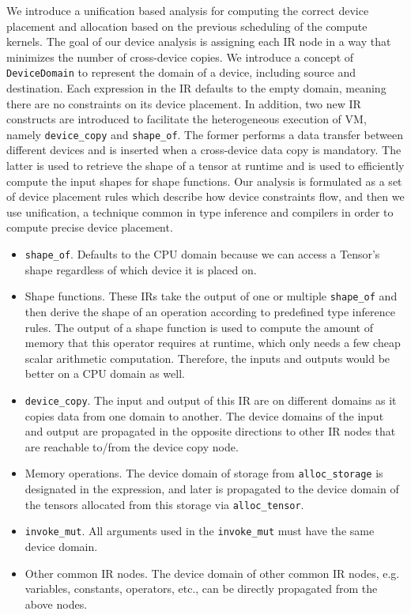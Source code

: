 We introduce a unification based analysis for computing the correct device placement and allocation based on the previous scheduling of the compute kernels. The goal of our device analysis is assigning each IR node in a way that minimizes the number of cross-device copies. We introduce a concept of \texttt{DeviceDomain} to represent the domain of a device, including source and destination. Each expression in the IR defaults to the empty domain, meaning there are no constraints on its device placement. In addition, two new IR constructs are introduced to facilitate the heterogeneous execution of VM, namely \verb|device_copy| and \verb|shape_of|. The former performs a data transfer between different devices and is inserted when a cross-device data copy is mandatory. The latter is used to retrieve the shape of a tensor at runtime and is used to efficiently compute the input shapes for shape functions. Our analysis is formulated as a set of device placement rules which describe how device constraints flow, and then we use unification, a technique common in type inference and compilers in order to compute precise device placement.

\begin{itemize}
    \item \verb|shape_of|. Defaults to the CPU domain because we can access a Tensor's shape regardless of which device it is placed on.
    \item Shape functions. These IRs take the output of one or multiple \verb|shape_of| and then derive the shape of an operation according to predefined type inference rules. The output of a shape function is used to compute the amount of memory that this operator requires at runtime, which only needs a few cheap scalar arithmetic computation. Therefore, the inputs and outputs would be better on a CPU domain as well.
    \item \verb|device_copy|. The input and output of this IR are on different domains as it copies data from one domain to another. The device domains of the input and output are propagated in the opposite directions to other IR nodes that are reachable to/from the device copy node.
    \item Memory operations. The device domain of storage from \verb|alloc_storage| is designated in the expression, and later is propagated to the device domain of the tensors allocated from this storage via \verb|alloc_tensor|.
    \item \verb|invoke_mut|. All arguments used in the \verb|invoke_mut| must have the same device domain.
    \item Other common IR nodes. The device domain of other common IR nodes, e.g. variables, constants, operators, etc., can be directly propagated from the above nodes.
\end{itemize}

